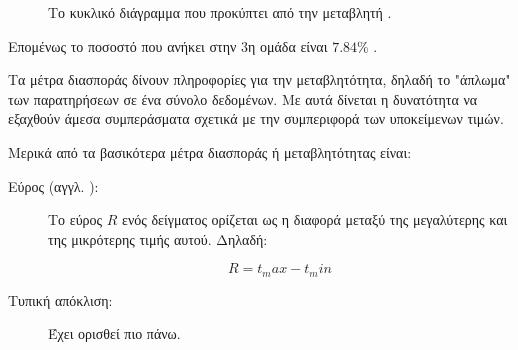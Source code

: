 \documentclass{assignment}
\begin{document}
\begin{Assignment}[Μέρος Α]
\begin{figure}[htbp]
  \centering
  \caption{Το κυκλικό διάγραμμα που προκύπτει από την μεταβλητή .}
\label{fig:views_2:pie}
\end{figure}

Επομένως το ποσοστό που ανήκει στην 3η ομάδα είναι $7.84$\% .



Τα μέτρα διασποράς δίνουν πληροφορίες για την μεταβλητότητα, δηλαδή το "άπλωμα" των παρατηρήσεων σε ένα σύνολο δεδομένων. Με αυτά δίνεται η δυνατότητα να εξαχθούν άμεσα συμπεράσματα σχετικά με την συμπεριφορά των υποκείμενων τιμών. \cite{biostatistic}

Μερικά από τα βασικότερα μέτρα διασποράς ή μεταβλητότητας είναι:

\begin{description}
\item [Εύρος (αγγλ. ):] Το εύρος $R$ ενός δείγματος ορίζεται ως η διαφορά μεταξύ της μεγαλύτερης και της μικρότερης τιμής αυτού. Δηλαδή:

\begin{equation}
R= t_max - t_min
\end{equation}

\item [Τυπική απόκλιση:] Έχει ορισθεί πιο πάνω.


\end{description}
\end{Assignment}
\end{document}

